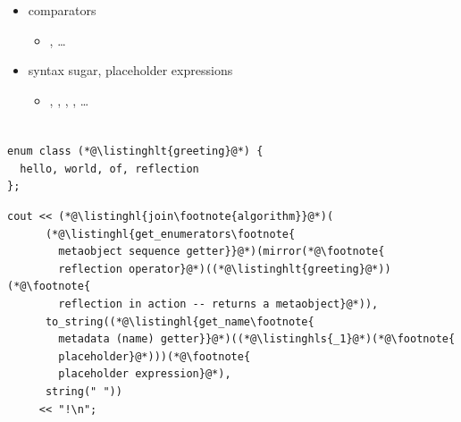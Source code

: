 \documentclass[compress,table,xcolor=table]{beamer}
\begin{document}
\begin{frame}[fragile]
\begin{columns}
\begin{column}{.50\textwidth}
\begin{itemize}
\begin{itemize}
          \end{itemize}
        \item comparators
          \begin{itemize}
            \smaller
            \item {}, \ldots
          \end{itemize}
        \item syntax sugar, placeholder expressions
          \begin{itemize}
            \smaller
            \item {}, ,
              , ,
              \ldots
          \end{itemize}
      \end{itemize}
    \end{column}
  \end{columns}
\end{frame}
\begin{frame}[fragile]
  \frametitle{}
  \begin{lstlisting}[language=c++2x,basicstyle=\normalsize\ttfamily]
enum class (*@\listinghlt{greeting}@*) {
  hello, world, of, reflection
};
  \end{lstlisting}
  \begin{lstlisting}[language=c++2x,basicstyle=\normalsize\ttfamily]
cout << (*@\listinghl{join\footnote{algorithm}}@*)(
      (*@\listinghl{get_enumerators\footnote{
        metaobject sequence getter}}@*)(mirror(*@\footnote{
        reflection operator}@*)((*@\listinghlt{greeting}@*))(*@\footnote{
        reflection in action -- returns a metaobject}@*)),
      to_string((*@\listinghl{get_name\footnote{
        metadata (name) getter}}@*)((*@\listinghls{_1}@*)(*@\footnote{
        placeholder}@*)))(*@\footnote{
        placeholder expression}@*),
      string(" "))
     << "!\n";
  \end{lstlisting}
\end{frame}
\end{document}
